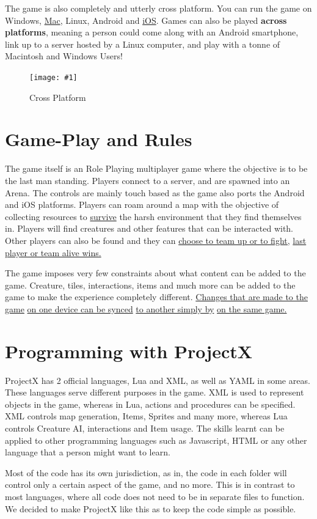 \documentclass{book}
\newcommand{\hFigure}[2]
	{\begin{figure}[ht!]
		\centering
		\texttt{[image: \#1]}
		\caption{#2}
	\end{figure}}
\begin{document}
	The game is also completely and utterly cross platform. You can run the game on Windows, \underline{Mac}, Linux, Android and \underline{iOS}. Games can also be played \textbf{across platforms}, meaning a person could come along with an Android smartphone, link up to a server hosted by a Linux computer, and play with a tonne of Macintosh and Windows Users!

	\hFigure{CrossPlatform.png}{Cross Platform}

	\section{Game-Play and Rules}
	The game itself is an Role Playing multiplayer game where the objective is to be the last man standing. Players connect to a server, and are spawned into an Arena. The controls are mainly touch based as the game also ports the Android and iOS platforms. Players can roam around a map with the objective of collecting resources to \underline{survive} the harsh environment that they find themselves in. Players will find creatures and other features that can be interacted with. Other players can also be found and they can \underline{choose to team up or to fight,} \underline{last player or team alive wins.}
	
	The game imposes very few constraints about what content can be added to the game. Creature, tiles, interactions, items and much more can be added to the game to make the experience completely different. \underline{Changes that are made to the game} \underline{on one device can be synced} \underline{to another simply by} \underline{on the same game.}
	
	\section{Programming with ProjectX}
	ProjectX has 2 official languages, Lua and XML, as well as YAML in some areas. These languages serve different purposes in the game. XML is used to represent objects in the game, whereas in Lua, actions and procedures can be specified. XML controls map generation, Items, Sprites and many more, whereas Lua controls Creature AI, interactions and Item usage. The skills learnt can be applied to other programming languages such as Javascript, HTML or any other language that a person might want to learn.
	
	Most of the code has its own jurisdiction, as in, the code in each folder will control only a certain aspect of the game, and no more. This is in contrast to most languages, where all code does not need to be in separate files to function. We decided to make ProjectX like this as to keep the code simple as possible.
	
\end{document}
